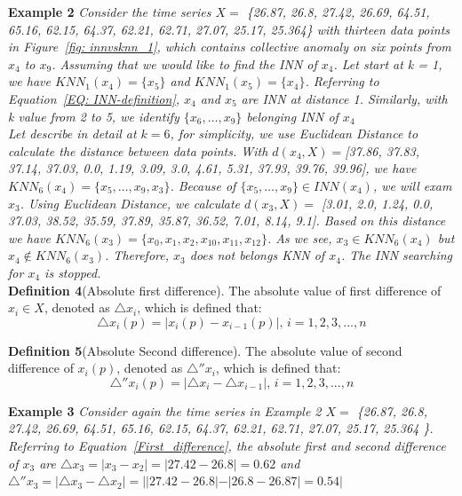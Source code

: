 \textbf{Example 2} \textit{\label{ex: 2} Consider the time series $X = $ \{26.87, 26.8, 27.42, 26.69, 64.51, 65.16, 62.15, 64.37, 62.21, 62.71, 27.07, 25.17, 25.364\} with thirteen data points in Figure~\ref{fig: innvsknn_1}, which contains collective anomaly on six points from $x_4$ to $x_9$. Assuming that we would like to find the INN of $x_4$. Let start at k = 1, we have $KNN_1(x_4) = \{x_5\}$ and $KNN_1(x_5) = \{x_4\}$. Referring to Equation~\ref{EQ: INN-definition}, $x_4$ and $x_5$ are INN at distance 1. Similarly, with k value from 2 to 5, we identify $\{x_6,\ldots,x_9\}$ belonging INN of $x_4$ \\
Let describe in detail at $k=6$, for simplicity, we use Euclidean Distance to calculate the distance between data points. With $
d(x_4, X) = $[37.86, 37.83, 37.14, 37.03, 0.0, 1.19, 3.09, 3.0, 4.61, 5.31, 37.93, 39.76, 39.96], we have $KNN_6(x_4) = \{x_5, \ldots, x_9, x_3\}$. Because of $\{x_5,\ldots,x_9\} \in INN(x_4)$, we will exam $x_3$. Using Euclidean Distance, we calculate $d(x_3, X) = $ [3.01, 2.0, 1.24, 0.0, 37.03, 38.52, 35.59, 37.89, 35.87, 36.52, 7.01, 8.14, 9.1]. Based on this distance we have $KNN_6(x_3) = \{x_0,x_1,x_2, x_{10}, x_{11}, x_{12}\}$. As we see, $x_3 \in KNN_6(x_4)$ but $x_4 \notin KNN_6(x_3)$. Therefore, $x_3$ does not belongs KNN of $x_4$. The INN searching for $x_4$ is stopped.}\\

\textbf{Definition 4}(Absolute first difference). The absolute value of first difference of $ x_{i} \in X $, denoted as $ \triangle x_i $, which is defined that:
\begin{equation}\label{First_difference}
\triangle x_i(p) = |x_{i}(p) - x_{i-1}(p)|,\, i = 1, 2, 3, ..., n
\end{equation}

\textbf{Definition 5}(Absolute Second difference). The absolute value of second difference of  $ x_{i}(p) $, denoted as $ \triangle '' x_i $, which is defined that:
\begin{equation}\label{Second_difference}
\triangle '' x_i(p) = |\triangle x_{i} - \triangle x_{i-1}|,\, i = 1, 2, 3, ..., n
\end{equation}

\textbf{Example 3} \textit{Consider again the time series in Example 2 $X = $ \{26.87, 26.8, 27.42, 26.69, 64.51, 65.16, 62.15, 64.37, 62.21, 62.71, 27.07, 25.17, 25.364 \}. Referring to Equation~\ref{First_difference}, the absolute first and second difference of $x_3$ are $\triangle x_3 = |x_3-x_2| = |27.42 - 26.8| = 0.62$ and $\triangle '' x_3 = |\triangle x_3 - \triangle x_2| = ||27.42 - 26.8| - |26.8 - 26.87| = 0.54|$}\\

